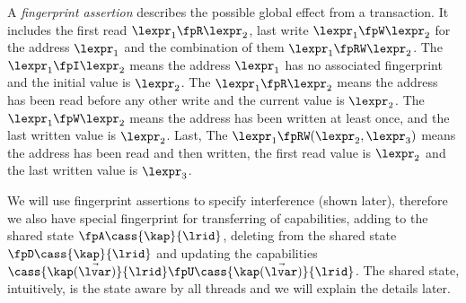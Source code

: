 A \emph{fingerprint assertion} describes the possible global effect from a transaction.
It includes the first read \( \lexpr_{1} \fpR \lexpr_{2} \), last write \( \lexpr_{1} \fpW \lexpr_{2} \) for the address \( \lexpr_{1} \) and the combination of them \( \lexpr_{1} \fpRW \lexpr_{2} \).
The \( \lexpr_{1} \fpI \lexpr_{2} \) means the address \( \lexpr_{1} \) has no associated fingerprint and the initial value is \( \lexpr_{2} \).
The \( \lexpr_{1} \fpR \lexpr_{2} \) means the address has been read before any other write and the current value is \( \lexpr_{2} \).
The \( \lexpr_{1} \fpW \lexpr_{2} \) means the address has been written at least once, and the last written value is \( \lexpr_{2} \).
Last, The \( \lexpr_{1} \fpRW (\lexpr_{2}, \lexpr_{3}) \) means the address has been read and then written, the first read value is \( \lexpr_{2} \) and the last written  value is \( \lexpr_{3} \).

We will use fingerprint assertions to specify interference (shown later), therefore we also have special fingerprint for transferring of capabilities, \ie adding to the shared state \( \fpA \cass{\kap}{\lrid} \), deleting from the shared state \( \fpD \cass{\kap}{\lrid} \) and updating the capabilities \( \cass{\kap(\vec{\lvar})}{\lrid} \fpU \cass{\kap(\vec{\lvar})}{\lrid} \).
The shared state, intuitively, is the state aware by all threads and we will explain the details later.


